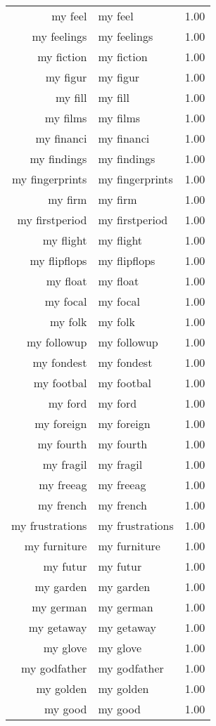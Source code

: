 \begin{table}[ht]
\begin{tabular}{rlr}
  my feel & my feel & 1.00 \\ 
  my feelings & my feelings & 1.00 \\ 
  my fiction & my fiction & 1.00 \\ 
  my figur & my figur & 1.00 \\ 
  my fill & my fill & 1.00 \\ 
  my films & my films & 1.00 \\ 
  my financi & my financi & 1.00 \\ 
  my findings & my findings & 1.00 \\ 
  my fingerprints & my fingerprints & 1.00 \\ 
  my firm & my firm & 1.00 \\ 
  my firstperiod & my firstperiod & 1.00 \\ 
  my flight & my flight & 1.00 \\ 
  my flipflops & my flipflops & 1.00 \\ 
  my float & my float & 1.00 \\ 
  my focal & my focal & 1.00 \\ 
  my folk & my folk & 1.00 \\ 
  my followup & my followup & 1.00 \\ 
  my fondest & my fondest & 1.00 \\ 
  my footbal & my footbal & 1.00 \\ 
  my ford & my ford & 1.00 \\ 
  my foreign & my foreign & 1.00 \\ 
  my fourth & my fourth & 1.00 \\ 
  my fragil & my fragil & 1.00 \\ 
  my freeag & my freeag & 1.00 \\ 
  my french & my french & 1.00 \\ 
  my frustrations & my frustrations & 1.00 \\ 
  my furniture & my furniture & 1.00 \\ 
  my futur & my futur & 1.00 \\ 
  my garden & my garden & 1.00 \\ 
  my german & my german & 1.00 \\ 
  my getaway & my getaway & 1.00 \\ 
  my glove & my glove & 1.00 \\ 
  my godfather & my godfather & 1.00 \\ 
  my golden & my golden & 1.00 \\ 
  my good & my good & 1.00 \\ 

\end{tabular}
\end{table}
